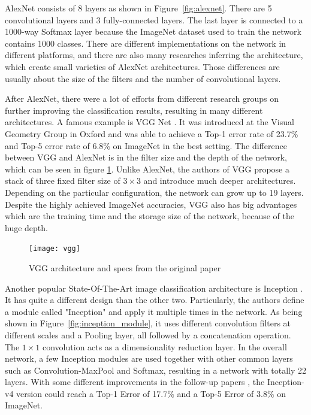 AlexNet consists of 8 layers as shown in Figure~\ref{fig:alexnet}. There are 5
convolutional layers and 3 fully-connected layers. The last layer is connected to a
1000-way Softmax layer because the ImageNet dataset \cite{imagenet} used to train the
network contains 1000 classes. There are different implementations on the network in
different platforms, and there are also many researches inferring the architecture, which
create small varieties of AlexNet architectures. Those differences are usually about the
size of the filters and the number of convolutional layers.

After AlexNet, there were a lot of efforts from different research groups on further
improving the classification results, resulting in many different architectures. A famous
example is VGG Net \cite{vgg}. It was introduced at the Visual Geometry Group in Oxford
and was able to achieve a Top-1 error rate of 23.7\% and Top-5 error rate of 6.8\% on
ImageNet in the best setting. The difference between VGG and AlexNet is in the filter size
and the depth of the network, which can be seen in figure \ref{fig:vgg}. Unlike AlexNet,
the authors of VGG propose a stack of three fixed filter size of $3 \times 3$ and
introduce much deeper architectures. Depending on the particular configuration, the
network can grow up to 19 layers. Despite the highly achieved ImageNet accuracies, VGG
also has big advantages which are the training time and the storage size of the network,
because of the huge depth.

\begin{figure}[h]
	\centering
	\texttt{[image: vgg]}
	\caption{VGG architecture and specs from the original paper \cite{vgg}}
	\label{fig:vgg}
\end{figure}

Another popular State-Of-The-Art image classification architecture is Inception
\cite{inception1}. It has quite a different design than the other two. Particularly, the
authors define a module called "Inception" and apply it multiple times in the network. As
being shown in Figure~\ref{fig:inception_module}, it uses different convolution filters at
different scales and a Pooling layer, all followed by a concatenation operation. The $1
\times 1$ convolution acts as a dimensionality reduction layer. In the overall network, a
few Inception modules are used together with other common layers such as
Convolution-MaxPool and Softmax, resulting in a network with totally 22 layers. With some
different improvements in the follow-up papers \cite{inception2, inception3}, the
Inception-v4 version could reach a Top-1 Error of 17.7\% and a Top-5 Error of 3.8\% on
ImageNet. 

